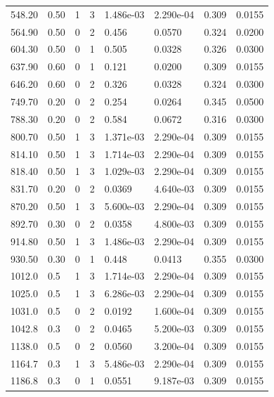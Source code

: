 \documentclass[preview]{standalone}
\begin{document}
{{\begin{tabular}{L{1.2cm}C{1.2cm} C{0.3cm}C{0.5cm} C{1.4cm}C{1.4cm} C{1.4cm}C{1.4cm}}
  548.20  &  0.50  & 1     &  3 &  1.486e-03  & 2.290e-04  & 0.309 &  0.0155   \\ 
  564.90  &  0.50  & 0     &  2 &  0.456  & 0.0570  & 0.324 &  0.0200   \\ 
  604.30  &  0.50  & 0     &  1 &  0.505  & 0.0328  & 0.326 &  0.0300   \\ 
  637.90  &  0.60  & 0     &  1 &  0.121  & 0.0200  & 0.309 &  0.0155   \\ 
  646.20  &  0.60  & 0     &  2 &  0.326  & 0.0328  & 0.324 &  0.0300   \\ 
  749.70  &  0.20  & 0     &  2 &  0.254  & 0.0264  & 0.345 &  0.0500   \\ 
  788.30  &  0.20  & 0     &  2 &  0.584  & 0.0672  & 0.316 &  0.0300   \\ 
  800.70  &  0.50  & 1     &  3 &  1.371e-03  & 2.290e-04  & 0.309 &  0.0155   \\ 
  814.10  &  0.50  & 1     &  3 &  1.714e-03  & 2.290e-04  & 0.309 &  0.0155   \\ 
  818.40  &  0.50  & 1     &  3 &  1.029e-03  & 2.290e-04  & 0.309 &  0.0155   \\ 
  831.70  &  0.20  & 0     &  2 &  0.0369  & 4.640e-03  & 0.309 &  0.0155   \\ 
  870.20  &  0.50  & 1     &  3 &  5.600e-03  & 2.290e-04  & 0.309 &  0.0155   \\ 
  892.70  &  0.30  & 0     &  2 &  0.0358  & 4.800e-03  & 0.309 &  0.0155   \\ 
  914.80  &  0.50  & 1     &  3 &  1.486e-03  & 2.290e-04  & 0.309 &  0.0155   \\ 
  930.50  &  0.30  & 0     &  1 &  0.448  & 0.0413  & 0.355 &  0.0300   \\ 
  1012.0  &   0.5  & 1     &  3 &  1.714e-03  & 2.290e-04  & 0.309 &  0.0155   \\ 
  1025.0  &   0.5  & 1     &  3 &  6.286e-03  & 2.290e-04  & 0.309 &  0.0155   \\ 
  1031.0  &   0.5  & 0     &  2 &  0.0192  & 1.600e-04  & 0.309 &  0.0155   \\ 
  1042.8  &   0.3  & 0     &  2 &  0.0465  & 5.200e-03  & 0.309 &  0.0155   \\ 
  1138.0  &   0.5  & 0     &  2 &  0.0560  & 3.200e-04  & 0.309 &  0.0155   \\ 
  1164.7  &   0.3  & 1     &  3 &  5.486e-03  & 2.290e-04  & 0.309 &  0.0155   \\ 
  1186.8  &   0.3  & 0     &  1 &  0.0551  & 9.187e-03  & 0.309 &  0.0155   \\ 

\end{tabular}}}
\end{document}
